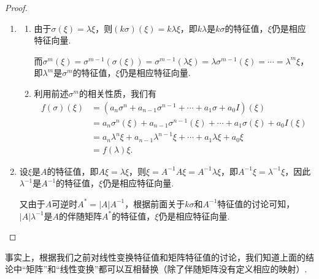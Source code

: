 \begin{proof}
    \begin{enumerate}
        \item \begin{enumerate}
                  \item 由于$\sigma(\xi)=\lambda\xi$，则$(k\sigma)(\xi)=k\lambda\xi$，即$k\lambda$是$k\sigma$的特征值，$\xi$仍是相应特征向量.

                        而$\sigma^m(\xi)=\sigma^{m-1}(\sigma(\xi))=\sigma^{m-1}(\lambda\xi)=\lambda\sigma^{m-1}(\xi)=\cdots=\lambda^m\xi$，即$\lambda^m$是$\sigma^m$的特征值，$\xi$仍是相应特征向量.

                  \item 利用前述$\sigma^m$的相关性质，我们有
                        \begin{align*}
                            f(\sigma)(\xi) & = (a_n\sigma^n+a_{n-1}\sigma^{n-1}+\cdots+a_1\sigma+a_0I)(\xi)              \\
                                           & = a_n\sigma^n(\xi)+a_{n-1}\sigma^{n-1}(\xi)+\cdots+a_1\sigma(\xi)+a_0I(\xi) \\
                                           & = a_n\lambda^n\xi+a_{n-1}\lambda^{n-1}\xi+\cdots+a_1\lambda\xi+a_0\xi       \\
                                           & = f(\lambda)\xi.
                        \end{align*}
              \end{enumerate}

        \item 设$\xi$是$A$的特征值，即$A\xi=\lambda\xi$，则$\xi=A^{-1}A\xi=A^{-1}\lambda\xi$，即$A^{-1}\xi=\lambda^{-1}\xi$，因此$\lambda^{-1}$是$A^{-1}$的特征值，$\xi$仍是相应特征向量.

              又由于$A$可逆时$A^*=|A|A^{-1}$，根据前面关于$k\sigma$和$A^{-1}$特征值的讨论可知，$|A|\lambda^{-1}$是$A$的伴随矩阵$A^*$的特征值，$\xi$仍是相应特征向量.
    \end{enumerate}
\end{proof}

事实上，根据我们之前对线性变换特征值和矩阵特征值的讨论，我们知道上面的结论中``矩阵''和``线性变换''都可以互相替换（除了伴随矩阵没有定义相应的映射）.

